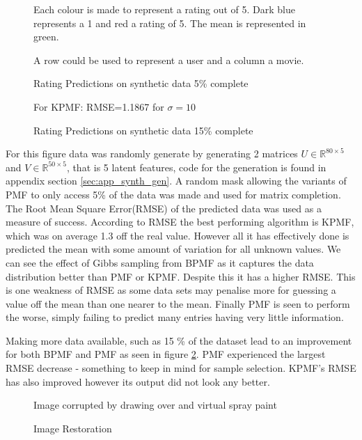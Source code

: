 \begin{figure}[!htbp]
  \begin{center}
    \resizebox{\textwidth}{!}{}
    Each colour is made to represent a rating out of 5. Dark blue represents a 1 and red a rating of 5. The mean is represented in green.
    
    A row could be used to represent a user and a column a movie.
    \caption{Rating Predictions on synthetic data 5\% complete}
     \label{fig:5pcmat}
  \end{center}
\end{figure}
\begin{figure}[!htbp]
  \begin{center} 
    \resizebox{\textwidth}{!}{}
    For KPMF: RMSE=1.1867 for $\sigma=10$
    \caption{Rating Predictions on synthetic data 15\% complete}
    \label{fig:15pcmat}
  \end{center}
\end{figure}
For this figure data was randomly generate by generating 2 matrices $U \in \mathbb{R}^{80\times 5}$ and $V \in \mathbb{R}^{50\times 5}$, that is 5 latent features, code for the generation is found in appendix section \ref{sec:app_synth_gen}. A  random mask allowing the variants of PMF to only access 5\% of the data was made and used for matrix completion. The Root Mean Square Error(RMSE) of the predicted data was used as a measure of success. According to RMSE the best performing algorithm is KPMF, which was on average 1.3 off the real value. However all it has effectively done is predicted the mean with some amount of variation for all unknown values. We can see the effect of Gibbs sampling from BPMF as it captures the data distribution better than PMF or KPMF. Despite this it has a higher RMSE. This is one weakness of RMSE as some data sets may penalise more for guessing a value off the mean than one nearer to the mean. Finally PMF is seen to perform the worse, simply failing to predict many entries having very little information.

Making more data available, such as 15 \% of the dataset lead to an improvement for both BPMF and PMF as seen in figure \ref{fig:15pcmat}. PMF experienced the largest RMSE decrease -  something to keep in mind for sample selection. KPMF's RMSE has also improved however its output did not look any better.
\begin{figure}[!htbp]
  \begin{center}
    \resizebox{\textwidth}{!}{}
    Image corrupted by drawing over and virtual spray paint
    \caption{Image Restoration}
    \label{fig:eiffel_tower}
  \end{center}
\end{figure}

